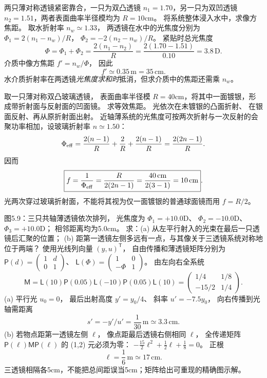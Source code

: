 两只薄对称透镜紧密靠合，一只为双凸透镜
$n_1=1.70$，另一只为双凹透镜
$n_2=1.51$，两者表面曲率半径模均为
$R=10$cm。
将系统整体浸入水中，求像方焦距。
\exsolution
取水折射率 $n_w\simeq1.33$，
两透镜在水中的光焦度分别为
$\Phi_1=2(n_1-n_w)/R$，
$\Phi_2=-2(n_2-n_w)/R$。
紧贴时总光焦度
\[
\Phi=\Phi_1+\Phi_2=
\frac{2(n_1-n_2)}R
=\frac{2(1.70-1.51)}{0.10}
=3.8\,\mathrm D.
\]
介质中像方焦距 $f'=n_w/\Phi$，
因此
\[
\boxed{f'\simeq0.35\,\mathrm m=35\,\mathrm{cm}}.
\]
\excheck 水介质折射率在两透镜\emph{光焦度求和时}抵消，但求介质中的焦距还需乘 $n_w$。

取一只薄对称双凸玻璃透镜，
表面曲率半径模
$R=40$cm，将其中一面镀银，形成带折射面与反射面的凹面镜。
求等效焦距。
\exsolution
光依次在未镀银的凸面折射、
在银面反射、再从原折射面出射。
近轴薄系统的光焦度可按两次折射与一次反射的会聚功率相加，设玻璃折射率 $n\simeq1.50$：
\[
\Phi_{\rm eff}=
\frac{2(n-1)}R+\frac2R+
\frac{2(n-1)}R
=\frac{2(2n-1)}R.
\]
因而
\[
\boxed{f=\frac1{\Phi_{\rm eff}}
=\frac{R}{2(2n-1)}
=\frac{40\,\mathrm{cm}}{2(3-1)}
=10\,\mathrm{cm}}.
\]
\excheck 光两次穿过玻璃折射面，不能将其视为仅一面镀银的普通球面镜而用 $f=R/2$。

图5.9：三只共轴薄透镜依次排列，
光焦度为
$\Phi_1=+10.0$D、
$\Phi_2=-10.0$D、
$\Phi_3=+10.0$D；
相邻距离均为5.0cm。
求：(a) 从左平行射入的光束在最后一只透镜后汇聚的位置；
(b) 距第一透镜左侧多远有一点，与其像关于三透镜系统对称地位于两端？
\exsolution
使用光线列向量
$(y,u)^{\mathsf T}$，
自由传播和薄透镜矩阵分别为
$\mathsf P(d)=\begin{pmatrix}1&d\\0&1\end{pmatrix}$、
$\mathsf L(\Phi)=\begin{pmatrix}1&0\\-\Phi&1\end{pmatrix}$。
由左向右全系统
\[
\mathsf M=
\mathsf L(10)\mathsf P(0.05)
\mathsf L(-10)\mathsf P(0.05)\mathsf L(10)
=\begin{pmatrix}1/4&1/8\\-15/2&1/4\end{pmatrix}.
\]
(a) 平行光 $u_0=0$，
最后出射高度 $y'=y_0/4$、
斜率 $u'=-7.5y_0$，
向右传播到光轴需距离
\[
\boxed{s'=-y'/u'=\frac1{30}\,\mathrm m
\simeq3.3\,\mathrm{cm}}.
\]
(b) 若物点距第一透镜左侧 $\ell$，
像点距最后透镜右侧相同 $\ell$，
全传递矩阵
$\mathsf P(\ell)\mathsf M\mathsf P(\ell)$
的 (1,2) 元必须为零：
$-\tfrac{15}{2}\ell^2+\tfrac12\ell+\tfrac18=0$。
正根
\[
\boxed{\ell=\frac16\,\mathrm m\simeq17\,\mathrm{cm}}.
\]
\excheck 三透镜相隔各5cm，不能把总间距误当5cm；矩阵给出可重现的精确图示解。

